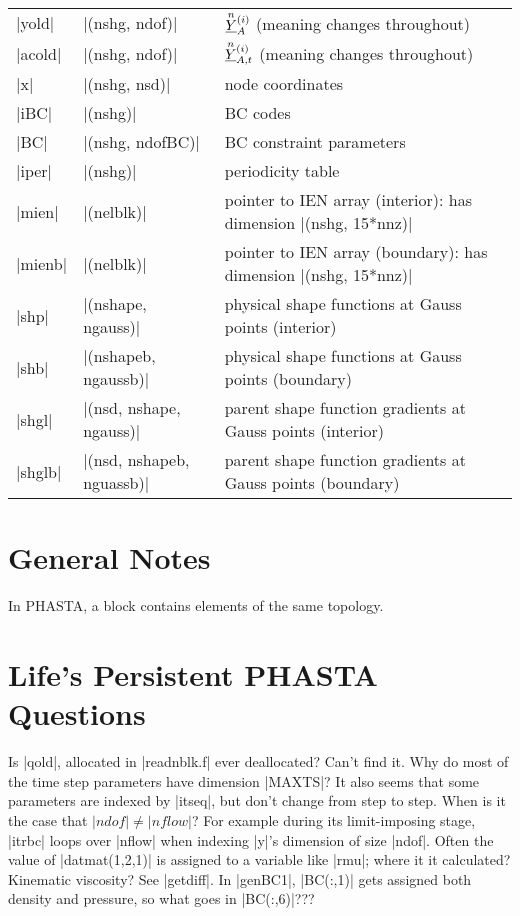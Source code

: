 \documentclass[11pt]{article}
\begin{document}
\begin{center}
\begin{tabular}{@{}lll@{}}
|yold|   & |(nshg, ndof)|            & $\oset{n}{\ul{Y}}_{A}^{(i)}$ (meaning changes throughout) \\
|acold|  & |(nshg, ndof)|            & $\oset{n}{\ul{Y}}_{A,t}^{(i)}$ (meaning changes throughout) \\
|x|      & |(nshg, nsd)|             & node coordinates \\
|iBC|    & |(nshg)|                  & BC codes \\
|BC|     & |(nshg, ndofBC)|          & BC constraint parameters \\
|iper|   & |(nshg)|				    & periodicity table \\
|mien|   & |(nelblk)|			    & pointer to IEN array (interior): has dimension |(nshg, 15*nnz)| \\
|mienb|  & |(nelblk)|			    & pointer to IEN array (boundary): has dimension |(nshg, 15*nnz)| \\
|shp|    & |(nshape, ngauss)|        & physical shape functions at Gauss points (interior) \\
|shb|    & |(nshapeb, ngaussb)|      & physical shape functions at Gauss points (boundary) \\
|shgl|   & |(nsd, nshape, ngauss)|   & parent shape function gradients at Gauss points (interior) \\
|shglb|  & |(nsd, nshapeb, nguassb)| & parent shape function gradients at Gauss points (boundary) \\
\bottomrule
\end{tabular}
\label{tbl:symbols}
\end{center}

\section{General Notes}
\begin{outline}[deep]
\1 In PHASTA, a block contains elements of the same topology.
\end{outline}

\section{Life's Persistent PHASTA Questions}
\begin{outline}[deep]
	\1 Is |qold|, allocated in |readnblk.f| ever deallocated? Can't find it.
	\1 Why do most of the time step parameters have dimension |MAXTS|?
		\2 It also seems that some parameters are indexed by |itseq|, but don't change from step to step.
	\1 When is it the case that $|ndof| \ne |nflow|$? For example during its limit-imposing stage, |itrbc| loops over |nflow| when indexing |y|'s dimension of size |ndof|.
	\1 Often the value of |datmat(1,2,1)| is assigned to a variable like |rmu|; where it it calculated? Kinematic viscosity? See |getdiff|.
	\1 In |genBC1|, |BC(:,1)| gets assigned both density and pressure, so what goes in |BC(:,6)|???
\end{outline}

\label{lastpage}
\end{document}
